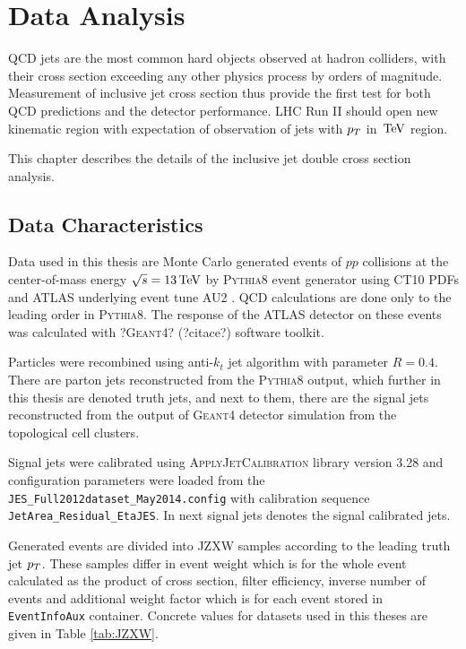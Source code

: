 \chapter{Data Analysis}


QCD jets are the most common hard objects observed at hadron colliders, with
their cross section exceeding any other physics process by orders of magnitude.
Measurement of inclusive jet cross section thus provide the first test for both
QCD predictions and the detector performance. LHC Run II should open new
kinematic region with expectation of observation of jets with $p_{T}$ in $\,\text{TeV}$
region.

This chapter describes the details of the inclusive jet double cross section
analysis.

\section{Data Characteristics}

Data used in this thesis are Monte Carlo generated events of $pp$ collisions at
the center-of-mass energy $\sqrt{s} = 13\,\text{TeV}$ by \textsc{Pythia8}
\cite{Pythia8} event generator using CT10 PDFs \cite{CT10PDF} and ATLAS underlying event
tune AU2 \cite{AU2}. QCD calculations are done only to the leading order in
\textsc{Pythia8}. The response of the ATLAS detector on these events was
calculated with ?\textsc{Geant4}? (?citace?) software toolkit.

Particles were recombined using anti-$k_t$ jet algorithm with parameter $R=0.4$.
There are parton jets reconstructed from the \textsc{Pythia8} output, which
further in this thesis are denoted truth jets, and next to them, there are the
signal jets reconstructed from the output of \textsc{Geant4} detector
simulation from the topological cell clusters. 

Signal jets were calibrated using \textsc{ApplyJetCalibration}
\cite{ApplyJetCalibration} library version 3.28 and configuration parameters
were loaded from the \texttt{JES\_Full2012dataset\_May2014.config} with
calibration sequence \texttt{JetArea\_Residual\_EtaJES}. In next signal jets
denotes the signal calibrated jets.

Generated events are divided into JZXW samples according to
the leading truth jet $p_{T}$. These samples differ in event weight which is for
the whole event calculated as the product of cross section, filter efficiency,
inverse number of events and additional weight factor which is for each event
stored in \texttt{EventInfoAux} container. Concrete values for datasets used in
this theses are given in Table \ref{tab:JZXW}.  

